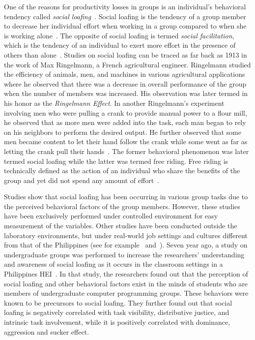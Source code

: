 \documentclass[a4paper,a4paper,BCOR12mm,12pt,abstracton,pointednumbers,tablecaptionabove,footinclude,halfparskip,normalheadings,]{scrartcl}
\begin{document}
One of the reasons for productivity losses in groups is an individual's behavioral tendency called {\em social loafing}~\citep{Latane79}. Social loafing is the tendency of a group member to decrease her individual effort when working in a group compared to when she is working alone~\citep{Williams91}. The opposite of social loafing is termed {\em social facilitation}, which is the tendency of an individual to exert more effort in the presence of others than alone~\citep{Cook01}. Studies on social loafing can be traced as far back as 1913 in the work of Max Ringelmann, a French agricultural engineer. Ringelmann studied the efficiency of animals, men, and machines in various agricultural applications where he observed that there was a decrease in overall performance of the group when the number of members was increased. His observation was later termed in his honor as the {\em Ringelmann Effect}. In another Ringelmann's experiment involving men who were pulling a crank to provide manual power to a flour mill, he observed that as more men were added into the task, each man began to rely on his neighbors to perform the desired output. He further observed that some men became content to let their hand  follow the crank while some went as far as letting the crank pull their hands~\citep{Kravitz86}. The former behavioral phenomenon was later termed social loafing while the latter was termed free riding. Free riding is technically defined as the action of an individual who share the benefits of the group and yet did not spend any amount of effort~\citep{Albanese85}. 

Studies show that social loafing has been occurring in various group tasks due to the perceived behavioral factors of the group members. However, these studies have been exclusively performed under controlled environment for easy measurement of the variables. Other studies have been conducted outside the laboratory environments, but under real-world job settings and cultures different from that of the Philippines (see for example~\citet{Earley89} and~\citet{Harkins80}). Seven year ago, a study on undergraduate groups was performed to increase the researchers' understanding and awareness of social loafing as it occurs in the classroom settings in a Philippines HEI~\citep{Pabico08}. In that study, the researchers found out that the perception of social loafing and other behavioral factors exist in the minds of students who are members of undergraduate computer programming groups. These behaviors were known to be precursors to social loafing. They further found out that social loafing is negatively correlated with task visibility, distributive justice, and intrinsic task involvement, while it is  positively correlated with dominance, aggression and sucker effect. 
\end{document}
